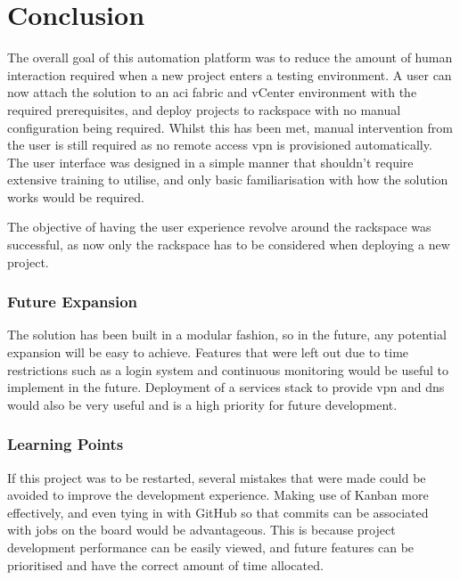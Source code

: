 \chapter{Conclusion}
\label{chap:conclusion}
The overall goal of this automation platform was to reduce the amount of human interaction required when a new project enters a testing environment. A user can now attach the solution to an \gls{aci} fabric and vCenter environment with the required prerequisites, and deploy projects to rackspace with no manual configuration being required. Whilst this has been met, manual intervention from the user is still required as no remote access \gls{vpn} is provisioned automatically.
The user interface was designed in a simple manner that shouldn't require extensive training to utilise, and only basic familiarisation with how the solution works would be required.

The objective of having the user experience revolve around the rackspace was successful, as now only the rackspace has to be considered when deploying a new project. 


\subsection{Future Expansion}
\label{sec:future-expansion}
The solution has been built in a modular fashion, so in the future,  any potential expansion will be easy to achieve. Features that were left out due to time restrictions such as a login system and continuous monitoring would be useful to implement in the future. Deployment of a services stack to provide \gls{vpn} and \gls{dns} would also be very useful and is a high priority for future development.

\subsection{Learning Points}
\label{sec:learning-points}
If this project was to be restarted, several mistakes that were made could be avoided to improve the development experience. Making use of Kanban more effectively, and even tying in with GitHub so that commits can be associated with jobs on the board would be advantageous. This is because project development performance can be easily viewed, and future features can be prioritised and have the correct amount of time allocated.
